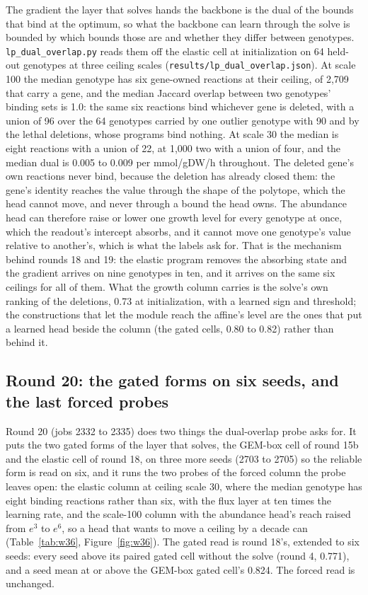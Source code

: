 The gradient the layer that solves hands the backbone is the dual of the bounds that
bind at the optimum, so what the backbone can learn through the solve is bounded by
which bounds those are and whether they differ between genotypes.
\texttt{lp\_dual\_overlap.py} reads them off the elastic cell at initialization on 64
held-out genotypes at three ceiling scales (\texttt{results/lp\_dual\_overlap.json}).
At scale 100 the median genotype has six gene-owned reactions at their ceiling, of
2,709 that carry a gene, and the median Jaccard overlap between two genotypes' binding
sets is 1.0: the same six reactions bind whichever gene is deleted, with a union of 96
over the 64 genotypes carried by one outlier genotype with 90 and by the lethal
deletions, whose programs bind nothing. At scale 30 the median is eight reactions
with a union of 22, at 1,000 two with a union of four, and the median dual is 0.005 to
0.009 per mmol/gDW/h throughout. The deleted gene's own reactions never bind, because
the deletion has already closed them: the gene's identity reaches the value through
the shape of the polytope, which the head cannot move, and never through a bound the
head owns. The abundance head can therefore raise or lower one growth level for every
genotype at once, which the readout's intercept absorbs, and it cannot move one
genotype's value relative to another's, which is what the labels ask for. That is the
mechanism behind rounds 18 and 19: the elastic program removes the absorbing state and
the gradient arrives on nine genotypes in ten, and it arrives on the same six
ceilings for all of them. What the growth column carries is the solve's own ranking of
the deletions, 0.73 at initialization, with a learned sign and threshold; the
constructions that let the module reach the affine's level are the ones that put a
learned head beside the column (the gated cells, 0.80 to 0.82) rather than behind it.

\subsection{Round 20: the gated forms on six seeds, and the last forced probes}
\label{sec:round20}

Round 20 (jobs 2332 to 2335) does two things the dual-overlap probe asks for. It puts
the two gated forms of the layer that solves, the GEM-box cell of round 15b and the
elastic cell of round 18, on three more seeds (2703 to 2705) so the reliable form is
read on six, and it runs the two probes of the forced column the probe leaves open:
the elastic column at ceiling scale 30, where the median genotype has eight binding
reactions rather than six, with the flux layer at ten times the learning rate, and the
scale-100 column with the abundance head's reach raised from $e^{3}$ to $e^{6}$, so a
head that wants to move a ceiling by a decade can (Table~\ref{tab:w36},
Figure~\ref{fig:w36}). The gated read is round 18's, extended to six seeds: every seed
above its paired gated cell without the solve (round 4, 0.771), and a seed mean at or
above the GEM-box gated cell's 0.824. The forced read is unchanged.

